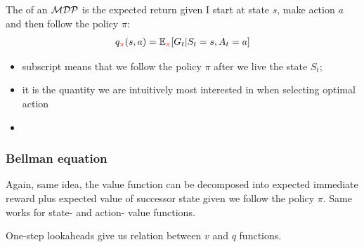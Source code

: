 The  of an $\mathcal{MDP}$ is the expected return given I start at state $s$, make action $a$ and then follow the policy $\pi$:
\begin{align}
	q_{\textcolor{red}{\pi}}(s, a) = \operatorname{\mathbb{E}}_{\textcolor{red}{\pi}}[G_t | S_t = s, A_t=a]
\end{align}
\begin{itemize}
	\item subscript \red{$\pi$} means that we follow the policy $\pi$ after we live the state $S_t$;
	\item it is the quantity we are intuitively most interested in when selecting optimal action
	\item {}
\end{itemize}

\subsubsection{Bellman equation}
Again, same idea, the value function can be decomposed into expected immediate reward plus expected value of successor state given we follow the policy $\pi$. Same works for state- and action- value functions.

One-step lookaheads give us relation between $v$ and $q$ functions.


